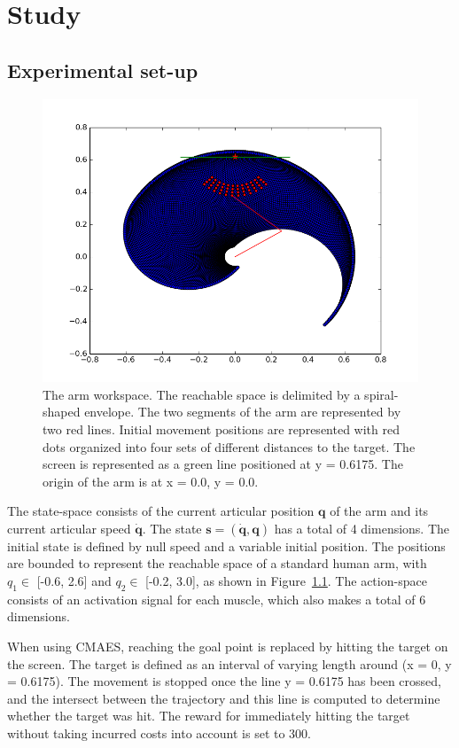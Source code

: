 \documentclass[pdftex,a4paper,11pt]{report}
\begin{document}
\chapter{Study}

\section{Experimental set-up}
\label{sec_ExpSetup}

\begin{figure}[hbt]
\centering
	\includegraphics[width=0.9\columnwidth]{figures/armWorkspace.png}
	\caption{The arm workspace. The reachable space is delimited by a spiral-shaped envelope. The two segments of the arm are represented by two red lines. Initial movement positions are represented with red dots organized into four sets of different distances to the target. The screen is represented as a green line positioned at y = 0.6175. The origin of the arm is at x = 0.0, y = 0.0.}
	\label{fig:arm_workspace}
\end{figure}
\pagebreak
The state-space consists of the current articular position $\textbf{q}$ of the arm and its current articular speed $\boldsymbol{\dot{q}}$. The state $\boldsymbol{s = (\dot{q}, q)}$ has a total of 4 dimensions. The initial state is defined by null speed and a variable initial position.
The positions are bounded to represent the reachable space of a standard human arm, with $q_1 \in$ [-0.6, 2.6] and $q_2 \in$ [-0.2, 3.0], as shown in Figure~\ref{fig:arm_workspace}.
The action-space consists of an activation signal for each muscle, which also makes a total of 6 dimensions.

When using CMAES, reaching the goal point is replaced by hitting the target on the screen. The target is defined as an interval of varying length around (x = 0, y = 0.6175). The movement is stopped once the line y = 0.6175 has been crossed, and the intersect between the trajectory and this line is computed to determine whether the target was hit. The reward for immediately hitting the target without taking incurred costs into account is set to 300.
\end{document}
